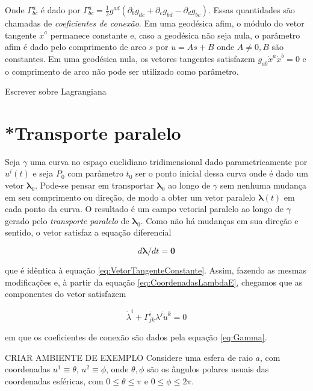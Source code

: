 Onde $ \Gamma^{a}_{bc} $ é dado por $ \Gamma_{b c}^{a}=\tfrac{1}{2} g^{a d}\left(\partial_{b} g_{d c}+\partial_{c} g_{b d}-\partial_{d} g_{b c}\right) $. Essas quantidades são chamadas de \textit{coeficientes de conexão}.
Em uma geodésica afim, o módulo do vetor tangente $ \dot{x}^a $ permanece constante e, caso a geodésica não seja nula, o parâmetro afim é dado pelo comprimento de arco $ s $ por $ u=As+B $ onde $ A\neq0,B $ são constantes. Em uma geodésica nula, os vetores tangentes satisfazem $ g_{a b} \dot{x}^{a} \dot{x}^{b}=0 $ e o comprimento de arco não pode ser utilizado como parâmetro.


{\color{red}Escrever sobre Lagrangiana}


 
\section{*Transporte paralelo}\label{sec:TransporteParalelo} %

Seja $ \gamma $ uma curva no espaço euclidiano tridimensional dado parametricamente por $ u^i(t) $ e seja $ P_0 $ com parâmetro $ t_0 $ ser o ponto inicial dessa curva onde é dado um vetor $ \boldsymbol{\lambda}_0 $. Pode-se pensar em transportar $ \boldsymbol{\lambda}_0 $ ao longo de $ \gamma $ sem nenhuma mudança em seu comprimento ou direção, de modo a obter um vetor paralelo $ \boldsymbol{\lambda}(t) $ em cada ponto da curva. O resultado é um campo vetorial paralelo ao longo de $ \gamma $ gerado pelo \textit{transporte paralelo} de $ \boldsymbol{\lambda}_0 $. Como não há mudanças em sua direção e sentido, o vetor satisfaz a equação diferencial 

\begin{equation}\label{eq:TransporteParalelo}
d \boldsymbol{\lambda} / d t=\mathbf{0}
\end{equation}

que é idêntica à equação \ref{eq:VetorTangenteConstante}. Assim, fazendo as mesmas modificações e, à partir da equação \ref{eq:CoordenadasLambdaE}, chegamos que as componentes do vetor satisfazem 

\begin{equation}\label{eq:CoordenadasLambda}
\dot{\lambda}^{i}+\Gamma_{j k}^{i} \lambda^{j} \dot{u}^{k}=0
\end{equation} 

em que os coeficientes de conexão são dados pela equação \ref{eq:Gamma}.

{\color{red}CRIAR AMBIENTE DE EXEMPLO}
Considere uma esfera de raio $a$, com coordenadas $u^1\equiv \theta,\, u^2\equiv\phi$, onde $\theta,\phi$ são os ângulos polares usuais das coordenadas esféricas, com $0\leq\theta\leq\pi$ e $0\leq\phi\leq 2\pi$.

